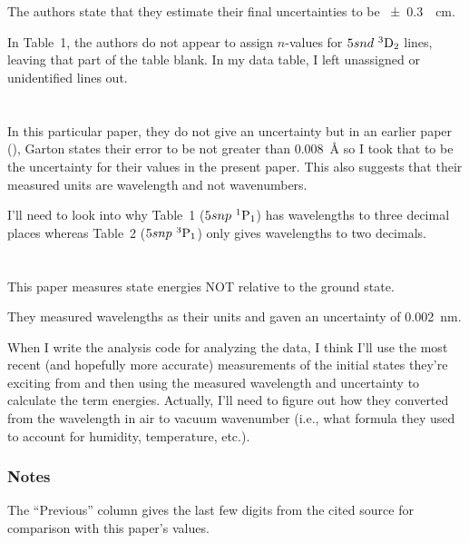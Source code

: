 \documentclass{article}
\newcommand{\tsup}{\textsuperscript}													%
\newcommand{\tsub}{\textsubscript}														%
\newcommand{\SLJ}[3]{\tsup{#1}\textnormal{#2}\tsub{#3}}
\newcommand{\nSLJ}[4]{{#1}\textnormal{ }\SLJ{#2}{#3}{#4}}
\begin{document}
\section{}

The authors state that they estimate their final uncertainties to be \SI{\pm 0.3}{\per\cm}. 

In Table~1, the authors do not appear to assign $n$-values for $\nSLJ{5snd}{3}{D}{2}$ lines, leaving that part of the table blank. In my data table, I left unassigned or unidentified lines out.

\section{}

In this particular paper, they do not give an uncertainty but in an earlier paper (\cite{gaw_1966}), Garton states their error to be not greater than \SI{0.008}{\angstrom} so I took that to be the uncertainty for their values in the present paper. This also suggests that their measured units are wavelength and not wavenumbers.

I'll need to look into why Table~1 ($\nSLJ{5snp}{1}{P}{1}$) has wavelengths to three decimal places whereas Table~2 ($\nSLJ{5snp}{3}{P}{1}$) only gives wavelengths to two decimals. 

\section{}

This paper measures state energies NOT relative to the ground state. 

They measured wavelengths as their units and gaven an uncertainty of \SI{0.002}{\nm}. 

When I write the analysis code for analyzing the data, I think I'll use the most recent (and hopefully more accurate) measurements of the initial states they're exciting from and then using the measured wavelength and uncertainty to calculate the term energies. Actually, I'll need to figure out how they converted from the wavelength in air to vacuum wavenumber (i.e., what formula they used to account for humidity, temperature, etc.). 

\subsubsection{Notes}

The ``Previous'' column gives the last few digits from the cited source for comparison with this paper's values. 
\end{document}
